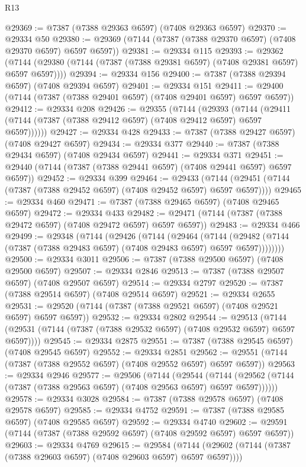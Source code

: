 \begin{lexlean}{R13}
\begin{coremodule}
@29369 := @7387 (@7388 @29363 @6597) (@7408 @29363 @6597)
@29370 := @29334 @50
@29380 := @29369 (@7144 (@7387 (@7388 @29370 @6597) (@7408 @29370 @6597) @6597 @6597))
@29381 := @29334 @115
@29393 := @29362
    (@7144 (@29380 (@7144 (@7387 (@7388 @29381 @6597) (@7408 @29381 @6597) @6597 @6597))))
@29394 := @29334 @156
@29400 := @7387 (@7388 @29394 @6597) (@7408 @29394 @6597)
@29401 := @29334 @151
@29411 := @29400 (@7144 (@7387 (@7388 @29401 @6597) (@7408 @29401 @6597) @6597 @6597))
@29412 := @29334 @208
@29426 := @29355
    (@7144
      (@29393
        (@7144 (@29411 (@7144 (@7387 (@7388 @29412 @6597) (@7408 @29412 @6597) @6597 @6597))))))
@29427 := @29334 @428
@29433 := @7387 (@7388 @29427 @6597) (@7408 @29427 @6597)
@29434 := @29334 @377
@29440 := @7387 (@7388 @29434 @6597) (@7408 @29434 @6597)
@29441 := @29334 @371
@29451 := @29440 (@7144 (@7387 (@7388 @29441 @6597) (@7408 @29441 @6597) @6597 @6597))
@29452 := @29334 @399
@29464 := @29433
    (@7144 (@29451 (@7144 (@7387 (@7388 @29452 @6597) (@7408 @29452 @6597) @6597 @6597))))
@29465 := @29334 @460
@29471 := @7387 (@7388 @29465 @6597) (@7408 @29465 @6597)
@29472 := @29334 @433
@29482 := @29471 (@7144 (@7387 (@7388 @29472 @6597) (@7408 @29472 @6597) @6597 @6597))
@29483 := @29334 @466
@29499 := @29348
    (@7144
      (@29426
        (@7144
          (@29464
            (@7144
              (@29482 (@7144 (@7387 (@7388 @29483 @6597) (@7408 @29483 @6597) @6597 @6597))))))))
@29500 := @29334 @3011
@29506 := @7387 (@7388 @29500 @6597) (@7408 @29500 @6597)
@29507 := @29334 @2846
@29513 := @7387 (@7388 @29507 @6597) (@7408 @29507 @6597)
@29514 := @29334 @2797
@29520 := @7387 (@7388 @29514 @6597) (@7408 @29514 @6597)
@29521 := @29334 @2655
@29531 := @29520 (@7144 (@7387 (@7388 @29521 @6597) (@7408 @29521 @6597) @6597 @6597))
@29532 := @29334 @2802
@29544 := @29513
    (@7144 (@29531 (@7144 (@7387 (@7388 @29532 @6597) (@7408 @29532 @6597) @6597 @6597))))
@29545 := @29334 @2875
@29551 := @7387 (@7388 @29545 @6597) (@7408 @29545 @6597)
@29552 := @29334 @2851
@29562 := @29551 (@7144 (@7387 (@7388 @29552 @6597) (@7408 @29552 @6597) @6597 @6597))
@29563 := @29334 @2946
@29577 := @29506
    (@7144
      (@29544
        (@7144 (@29562 (@7144 (@7387 (@7388 @29563 @6597) (@7408 @29563 @6597) @6597 @6597))))))
@29578 := @29334 @3028
@29584 := @7387 (@7388 @29578 @6597) (@7408 @29578 @6597)
@29585 := @29334 @4752
@29591 := @7387 (@7388 @29585 @6597) (@7408 @29585 @6597)
@29592 := @29334 @4740
@29602 := @29591 (@7144 (@7387 (@7388 @29592 @6597) (@7408 @29592 @6597) @6597 @6597))
@29603 := @29334 @4769
@29615 := @29584
    (@7144 (@29602 (@7144 (@7387 (@7388 @29603 @6597) (@7408 @29603 @6597) @6597 @6597))))

\end{coremodule}
\end{lexlean}
